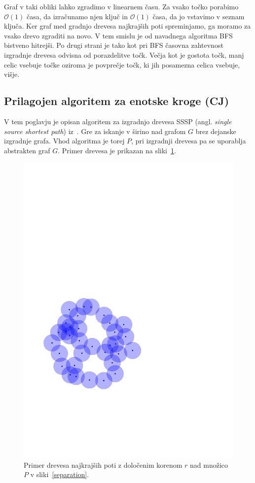 \documentclass[a4paper, 12pt]{book}
\newcommand{\OO}{\ensuremath{\mathcal{O}}} %
\begin{document}
Graf v taki obliki lahko zgradimo v linearnem času. Za vsako točko porabimo $\OO(1)$ časa, da izračunamo njen ključ in $\OO(1)$ časa, da jo vstavimo v seznam ključa. Ker graf med gradnjo drevesa najkrajših poti spreminjamo, ga moramo za vsako drevo zgraditi na novo. V tem smislu je od navadnega algoritma BFS bistveno hitrejši. Po drugi strani je tako kot pri BFS časovna zahtevnost izgradnje drevesa odvisna od porazdelitve točk. Večja kot je gostota točk, manj celic vsebuje točke oziroma je povprečje točk, ki jih posamezna celica vsebuje, višje.

\subsection{Prilagojen algoritem za enotske kroge (CJ)}
\label{sssp-tree}
V tem poglavju je opisan algoritem za izgradnjo drevesa SSSP (angl. \textit{single source shortest path}) iz~\cite{CJ15}. Gre za iskanje v širino nad grafom $G$ brez dejanske izgradnje grafa. Vhod algoritma je torej $P$, pri izgradnji drevesa pa se uporablja abstrakten graf $G$. Primer drevesa je prikazan na sliki~\ref{sssp-tree-ex}.

\begin{figure}[htp]
\centerline{\includegraphics[scale=0.6,page=6]{pics/unitdisks.pdf}}
\caption{Primer drevesa najkrajših poti z določenim korenom $r$ nad množico $P$ v sliki~\ref{separation}.}
\label{sssp-tree-ex}
\end{figure}
\end{document}
